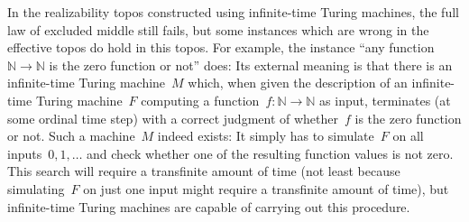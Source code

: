 \documentclass[graybox]{svmult}
\newcommand{\NN}{\mathbb{N}}
\renewcommand{\_}{\mathpunct{.}\,}
\newcommand{\effective}{ef{}fective\xspace}
\newcommand{\?}{\,{:}\,}
\begin{document}
In the realizability topos constructed using infinite-time Turing machines, the full
law of excluded middle still fails, but some instances which are wrong in the
\effective topos do hold in this topos. For example, the instance ``any
function~$\NN \to \NN$ is the zero function or not'' does: Its external meaning
is that there is an infinite-time Turing machine~$M$ which, when given the
description of an infinite-time Turing machine~$F$ computing a function~$f :
\NN \to \NN$ as input, terminates (at some ordinal time step) with a correct
judgment of whether~$f$ is the zero function or not. Such a machine~$M$ indeed
exists: It simply has to simulate~$F$ on all inputs~$0,1,\ldots$ and
check whether one of the resulting function values is not zero. This search
will require a transfinite amount of time (not least because simulating~$F$ on
just one input might require a transfinite amount of time), but infinite-time
Turing machines are capable of carrying out this procedure.
\end{document}
